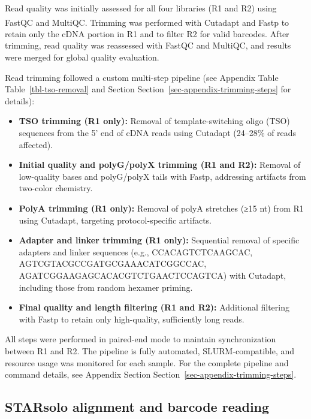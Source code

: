 \documentclass[
  11pt,
  a4paper,
]{report}
\providecommand{\tightlist}{%
  \setlength{\itemsep}{0pt}\setlength{\parskip}{0pt}}\usepackage{longtable,booktabs,array}
\begin{document}
Read quality was initially assessed for all four libraries (R1 and R2)
using FastQC and MultiQC. Trimming was performed with
Cutadapt\textsuperscript{} and
Fastp\textsuperscript{} to retain only the
cDNA portion in R1 and to filter R2 for valid barcodes. After trimming,
read quality was reassessed with FastQC and MultiQC, and results were
merged for global quality evaluation.

Read trimming followed a custom multi-step pipeline (see Appendix Table
Table~\ref{tbl-tso-removal} and Section
Section~\ref{sec-appendix-trimming-steps} for details):

\begin{itemize}
\tightlist
\item
  \textbf{TSO trimming (R1 only):} Removal of template-switching oligo
  (TSO) sequences from the 5' end of cDNA reads using Cutadapt (24--28\%
  of reads affected).
\item
  \textbf{Initial quality and polyG/polyX trimming (R1 and R2):} Removal
  of low-quality bases and polyG/polyX tails with Fastp, addressing
  artifacts from two-color chemistry.
\item
  \textbf{PolyA trimming (R1 only):} Removal of polyA stretches (≥15 nt)
  from R1 using Cutadapt, targeting protocol-specific artifacts.
\item
  \textbf{Adapter and linker trimming (R1 only):} Sequential removal of
  specific adapters and linker sequences (e.g., CCACAGTCTCAAGCAC,
  AGTCGTACGCCGATGCGAAACATCGGCCAC, AGATCGGAAGAGCACACGTCTGAACTCCAGTCA)
  with Cutadapt, including those from random hexamer priming.
\item
  \textbf{Final quality and length filtering (R1 and R2):} Additional
  filtering with Fastp to retain only high-quality, sufficiently long
  reads.
\end{itemize}

All steps were performed in paired-end mode to maintain synchronization
between R1 and R2. The pipeline is fully automated, SLURM-compatible,
and resource usage was monitored for each sample. For the complete
pipeline and command details, see Appendix Section
Section~\ref{sec-appendix-trimming-steps}.

\subsection{STARsolo alignment and barcode
reading}\label{starsolo-alignment-and-barcode-reading}
\end{document}
